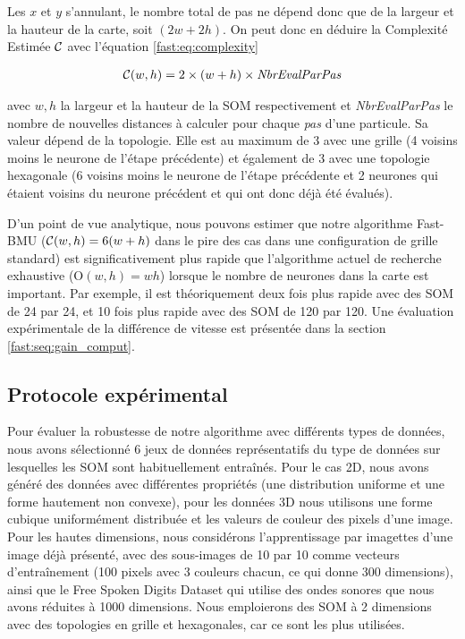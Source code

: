 	Les $x$ et $y$ s'annulant, le nombre total de pas ne dépend donc que de la largeur et la hauteur de la carte, soit $(2w + 2h)$. On peut donc en déduire la Complexité Estimée $\cal C$ avec l'équation \ref{fast:eq:complexity}

	\begin{align}\label{fast:eq:complexity}
    	{\cal C}(w, h) = 2 \times (w + h) \times \textit{NbrEvalParPas}
	\end{align}

	avec $w, h$ la largeur et la hauteur de la SOM respectivement et \textit{NbrEvalParPas} le nombre de nouvelles distances à calculer pour chaque \textit{pas} d'une particule. Sa valeur dépend de la topologie. Elle est au maximum de 3 avec une grille (4 voisins moins le neurone de l'étape précédente) et également de 3 avec une topologie hexagonale (6 voisins moins le neurone de l'étape précédente et 2 neurones qui étaient voisins du neurone précédent et qui ont donc déjà été évalués). 

	D'un point de vue analytique, nous pouvons estimer que notre algorithme Fast-BMU (${\cal C}(w,h)=6(w+h)$ dans le pire des cas dans une configuration de grille standard) est significativement plus rapide que l'algorithme actuel de recherche exhaustive (O$(w,h) = wh$) lorsque le nombre de neurones dans la carte est important. Par exemple, il est théoriquement deux fois plus rapide avec des SOM de 24 par 24, et 10 fois plus rapide avec des SOM de 120 par 120. Une évaluation expérimentale de la différence de vitesse est présentée dans la section \ref{fast:seq:gain_comput}.

	\subsection{Protocole expérimental}

	Pour évaluer la robustesse de notre algorithme avec différents types de données, nous avons sélectionné 6 jeux de données représentatifs du type de données sur lesquelles les SOM sont habituellement entraînés. Pour le cas 2D, nous avons généré des données avec différentes propriétés (une distribution uniforme et une forme hautement non convexe), pour les données 3D nous utilisons une forme cubique uniformément distribuée et les valeurs de couleur des pixels d'une image. Pour les hautes dimensions, nous considérons l'apprentissage par imagettes d'une image déjà présenté, avec des sous-images de 10 par 10 comme vecteurs d'entraînement (100 pixels avec 3 couleurs chacun, ce qui donne 300 dimensions), ainsi que le Free Spoken Digits Dataset \cite{zohar_jackson_2018_1342401} qui utilise des ondes sonores que nous avons réduites à 1000 dimensions. Nous emploierons des SOM à 2 dimensions avec des topologies en grille et hexagonales, car ce sont les plus utilisées.

